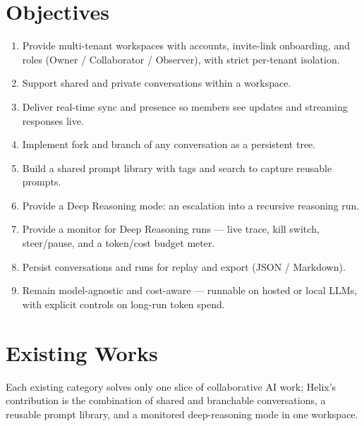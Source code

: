 \documentclass[12pt,a4paper]{report}
\begin{document}
\section{Objectives}
\begin{enumerate}
  \item Provide multi-tenant workspaces with accounts, invite-link onboarding, and roles (Owner / Collaborator / Observer), with strict per-tenant isolation.
  \item Support shared and private conversations within a workspace.
  \item Deliver real-time sync and presence so members see updates and streaming responses live.
  \item Implement fork and branch of any conversation as a persistent tree.
  \item Build a shared prompt library with tags and search to capture reusable prompts.
  \item Provide a Deep Reasoning mode: an escalation into a recursive reasoning run.
  \item Provide a monitor for Deep Reasoning runs --- live trace, kill switch, steer/pause, and a token/cost budget meter.
  \item Persist conversations and runs for replay and export (JSON / Markdown).
  \item Remain model-agnostic and cost-aware --- runnable on hosted or local LLMs, with explicit controls on long-run token spend.
\end{enumerate}

\section{Existing Works}
Each existing category solves only one slice of collaborative AI work; Helix's contribution is the combination of shared and branchable conversations, a reusable prompt library, and a monitored deep-reasoning mode in one workspace.
\end{document}

